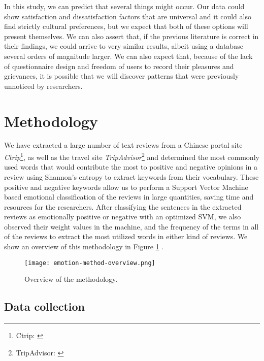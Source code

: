 \documentclass[review]{elsarticle}
\begin{document}
In this study, we can predict that several things might occur. Our data could show satisfaction and dissatisfaction factors that are universal and it could also find strictly cultural preferences, but we expect that both of these options will present themselves. We can also assert that, if the previous literature is correct in their findings, we could arrive to very similar results, albeit using a database several orders of magnitude larger. We can also expect that, because of the lack of questionnaire design and freedom of users to record their pleasures and grievances, it is possible that we will discover patterns that were previously unnoticed by researchers.

\section{Methodology}\label{method}

We have extracted a large number of text reviews from a Chinese portal site \textit{Ctrip}\footnote{\label{ctrip}Ctrip: \href {www.ctrip.com/}{}}, as well as the travel site \textit{TripAdvisor}\footnote{\label{tripadvisor}TripAdvisor: \href {www.tripadvisor.com/}{}} and determined the most commonly used words that would contribute the most to positive and negative opinions in a review using Shannon's entropy to extract keywords from their vocabulary. These positive and negative keywords allow us to perform a Support Vector Machine based emotional classification of the reviews in large quantities, saving time and resources for the researchers. After classifying the sentences in the extracted reviews as emotionally positive or negative with an optimized SVM, we also observed their weight values in the machine, and the frequency of the terms in all of the reviews to extract the most utilized words in either kind of reviews. We show an overview of this methodology in Figure \ref{fig:method-overview} \cite[][]{Aleman2018ICAROB}.

\begin{figure}[bp]
\centering
\texttt{[image: emotion-method-overview.png]}
\caption{Overview of the methodology.}
\label{fig:method-overview}
\end{figure}

\subsection{Data collection}\label{datacollection}
\end{document}

